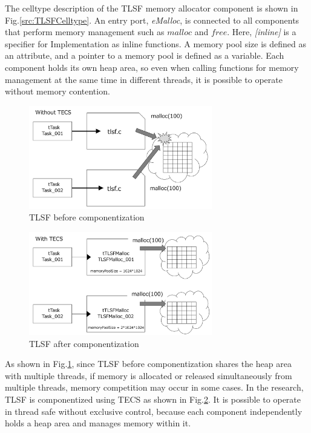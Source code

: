 \documentclass[JIP]{ipsj_v2/UTF8/ipsj}
\begin{document}
The celltype description of the TLSF memory allocator component is shown in Fig.\ref{src:TLSFCelltype}.
An entry port, {\it eMalloc}, is connected to all components that perform memory management such as $malloc$ and $free$.
Here, {\it [inline]} is a specifier for Implementation as inline functions.
A memory pool size is defined as an attribute, and a pointer to a memory pool is defined as a variable.
Each component holds its own heap area, so even when calling functions for memory management at the same time in different threads, it is possible to operate without memory contention.

\begin{figure}[t]
    \centering
    \includegraphics[width=8cm,clip]{figure/WithoutTECS.pdf}
    \caption{TLSF before componentization}
    \label{fig:WithoutTECS}
\end{figure}

\begin{figure}[t]
    \centering
    \includegraphics[width=8cm,clip]{figure/WithTECS.pdf}
    \caption{TLSF after componentization}
    \label{fig:WithTECS}
\end{figure}

As shown in Fig.\ref{fig:WithoutTECS}, since TLSF before componentization shares the heap area with multiple threads, if memory is allocated or released simultaneously from multiple threads, memory competition may occur in some cases.
In the research, TLSF is componentized using TECS as shown in Fig.\ref{fig:WithTECS}.
It is possible to operate in thread safe without exclusive control, because each component independently holds a heap area and manages memory within it. 
\end{document}
